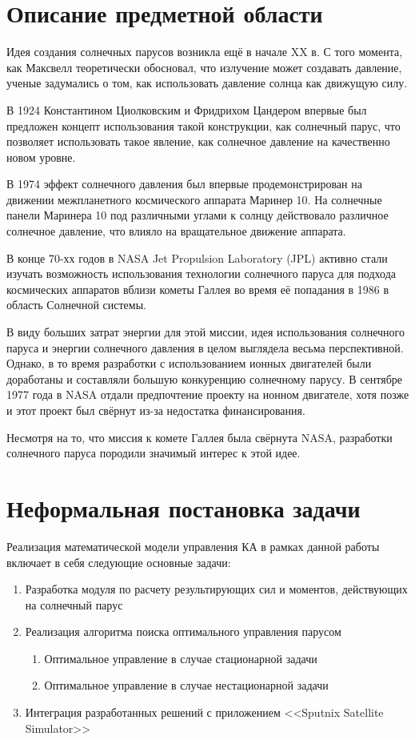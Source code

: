 \section{Описание предметной области}
\noindent\indent Идея создания солнечных парусов возникла ещё в начале XX в.
С того момента, как Максвелл теоретически обосновал, что излучение может создавать давление,
ученые задумались о том, как использовать давление солнца как движущую силу.\par
В 1924 Константином Циолковским и Фридрихом Цандером впервые был предложен концепт
использования такой конструкции, как солнечный парус, что позволяет использовать
такое явление, как солнечное давление на качественно новом уровне.\par
В 1974 эффект солнечного давления был впервые продемонстрирован на движении межпланетного
космического аппарата Маринер 10. На солнечные панели Маринера 10 под различными углами к солнцу
действовало различное солнечное давление, что влияло на вращательное движение аппарата.\par
В конце 70-хх годов в NASA Jet Propulsion Laboratory (JPL) активно стали изучать
возможность использования технологии солнечного паруса для подхода космических аппаратов
вблизи кометы Галлея во время её попадания в 1986 в область Солнечной системы.\par
В виду больших затрат энергии для этой миссии, идея использования солнечного паруса
и энергии солнечного давления в целом выглядела весьма перспективной.
Однако, в то время разработки с использованием ионных двигателей были доработаны и составляли
большую конкуренцию солнечному парусу. В сентябре 1977 года в NASA отдали предпочтение
проекту на ионном двигателе, хотя позже и этот проект был свёрнут из-за недостатка финансирования.\par
Несмотря на то, что миссия к комете Галлея была свёрнута NASA, разработки солнечного паруса
породили значимый интерес к этой идее.
\section{Неформальная постановка задачи}
\noindent\indent Реализация математической модели управления КА в рамках данной
работы включает в себя следующие основные задачи:
\begin{enumerate}[label=\arabic*.]
  \item Разработка модуля по расчету результирующих сил и моментов, действующих
  на солнечный парус
  \item Реализация алгоритма поиска оптимального управления парусом
  \begin{enumerate}[label*=\arabic*.]
    \item Оптимальное управление в случае стационарной задачи
    \item Оптимальное управление в случае нестационарной задачи
  \end{enumerate}
  \item Интеграция разработанных решений с приложением <<Sputnix Satellite Simulator>>
\end{enumerate}
